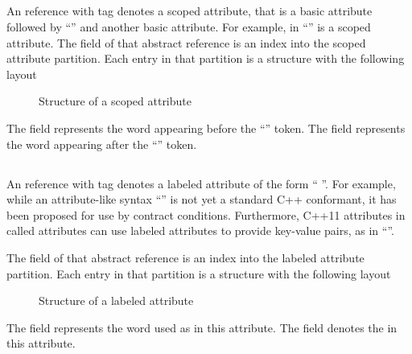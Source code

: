 

\subsection{}
\label{sec:ifc:AttrSort:Scoped}

An  reference with tag  denotes a scoped attribute, that is a
basic attribute followed by ``\code{::}'' and another basic attribute.
For example,  in ``'' is a scoped attribute.
The  field of that abstract reference is an index into the scoped attribute partition.
Each entry in that partition is a structure with the following layout
%
\begin{figure}[H]
    \centering
    \caption{Structure of a scoped attribute}
    \label{fig:ifc:AttrSort:Scoped}
\end{figure}
%
The  field represents the word appearing before the ``\code{::}'' token.
The  field represents the word appearing after the ``\code{::}'' token.


\subsection{}
\label{sec:ifc:AttrSort:Labeled}

An  reference with tag  denotes a labeled attribute of the form `` \code{:} ''.  For example,
while an attribute-like syntax ``\code{[[requires: x > 0]]}'' is not yet a standard C++ conformant, it has been proposed for use by contract conditions.  Furthermore, C++11 attributes in called 
attributes can use labeled attributes to provide key-value pairs, as in ``''.

The  field of that abstract reference is an index into the labeled attribute partition.  Each entry in that partition is a structure
with the following layout
%
\begin{figure}[H]
    \centering
    \caption{Structure of a labeled attribute}
    \label{fig:ifc:AttrSort:Labeled}
\end{figure}
%
The  field represents the word used as  in this attribute.
The  field denotes the  in this attribute.

